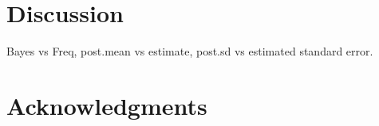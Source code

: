 \documentclass[article]{jss}
\begin{document}




\section[Discussion]{Discussion}
Bayes vs Freq, post.mean vs estimate, post.sd vs estimated standard error.
\section[acknowledgments]{Acknowledgments}


\end{document}
